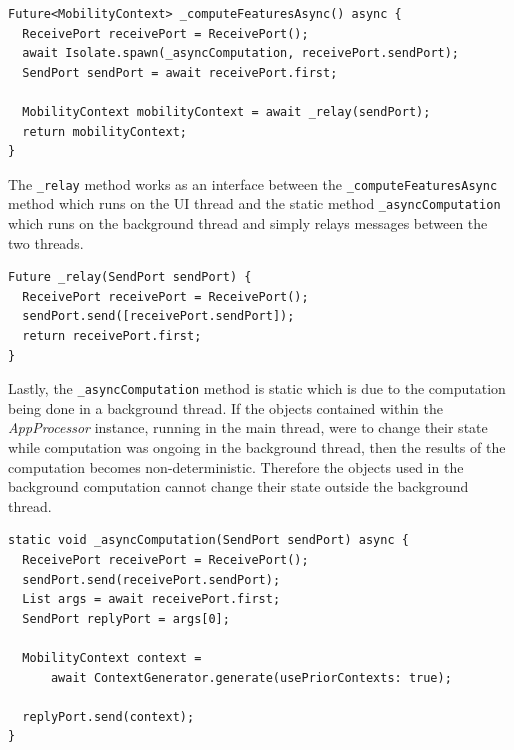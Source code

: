 \begin{verbatim}
Future<MobilityContext> _computeFeaturesAsync() async {
  ReceivePort receivePort = ReceivePort();
  await Isolate.spawn(_asyncComputation, receivePort.sendPort);
  SendPort sendPort = await receivePort.first;

  MobilityContext mobilityContext = await _relay(sendPort);
  return mobilityContext;
}
\end{verbatim}

The \verb|_relay| method works as an interface between the \verb|_computeFeaturesAsync| method which runs on the UI thread and the static method \verb|_asyncComputation| which runs on the background thread and simply relays messages between the two threads.

\begin{verbatim}
Future _relay(SendPort sendPort) {
  ReceivePort receivePort = ReceivePort();
  sendPort.send([receivePort.sendPort]);
  return receivePort.first;
}
\end{verbatim}

Lastly, the \verb|_asyncComputation| method is static which is due to the computation being done in a background thread. If the objects contained within the \textit{AppProcessor} instance, running in the main thread, were to change their state while computation was ongoing in the background thread, then the results of the computation becomes non-deterministic. Therefore the objects used in the background computation cannot change their state outside the background thread. 

\begin{verbatim}
static void _asyncComputation(SendPort sendPort) async {
  ReceivePort receivePort = ReceivePort();
  sendPort.send(receivePort.sendPort);
  List args = await receivePort.first;
  SendPort replyPort = args[0];

  MobilityContext context =
      await ContextGenerator.generate(usePriorContexts: true);

  replyPort.send(context);
}
\end{verbatim}

